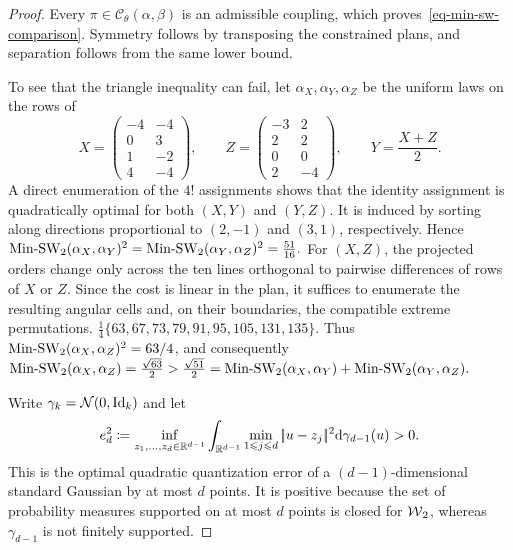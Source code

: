 \begin{proof}
Every $\pi\in\mathcal C_\theta(\alpha,\beta)$ is an admissible coupling, which proves~\eqref{eq-min-sw-comparison}. Symmetry follows by transposing the constrained plans, and separation follows from the same lower bound.

To see that the triangle inequality can fail, let $\alpha_X,\alpha_Y,\alpha_Z$ be the uniform laws on the rows of
\[
X=\begin{pmatrix}-4&-4\\0&3\\1&-2\\4&-4\end{pmatrix},
\qquad
Z=\begin{pmatrix}-3&2\\2&2\\0&0\\2&-4\end{pmatrix},
\qquad
Y=\frac{X+Z}{2}.
\]
A direct enumeration of the $4!$ assignments shows that the identity assignment is quadratically optimal for both $(X,Y)$ and $(Y,Z)$. It is induced by sorting along directions proportional to $(2,-1)$ and $(3,1)$, respectively. Hence
\(\operatorname{Min\text{-}SW}_2(\alpha_X,\alpha_Y)^2 = \operatorname{Min\text{-}SW}_2(\alpha_Y,\alpha_Z)^2 =\frac{51}{16}.\)
For $(X,Z)$, the projected orders change only across the ten lines orthogonal to pairwise differences of rows of $X$ or $Z$. Since the cost is linear in the plan, it suffices to enumerate the resulting angular cells and, on their boundaries, the compatible extreme permutations.
\(\frac14\{63,67,73,79,91,95,105,131,135\}\).
Thus $\operatorname{Min\text{-}SW}_2(\alpha_X,\alpha_Z)^2=63/4$, and consequently
\(\operatorname{Min\text{-}SW}_2(\alpha_X,\alpha_Z)=\frac{\sqrt{63}}{2} > \frac{\sqrt{51}}{2} = \operatorname{Min\text{-}SW}_2(\alpha_X,\alpha_Y) + \operatorname{Min\text{-}SW}_2(\alpha_Y,\alpha_Z).\)

Write $\gamma_k=\mathcal{N}(0,\mathrm{Id}_k)$ and let
\begin{equation}\label{eq-min-sw-quantization-obstruction}
e_d^2
\coloneqq
\inf_{z_1,\ldots,z_d\in\mathbb{R}^{d-1}}
\int_{\mathbb{R}^{d-1}}
\min_{1\leqslant j\leqslant d}|\!| u-z_j |\!|^2
\mathrm{d}\gamma_{d-1}(u)>0.
\end{equation}
This is the optimal quadratic quantization error of a $(d-1)$-dimensional standard Gaussian by at most $d$ points. It is positive because the set of probability measures supported on at most $d$ points is closed for $\operatorname{\mathcal{W}}_2$, whereas $\gamma_{d-1}$ is not finitely supported.


\end{proof}
